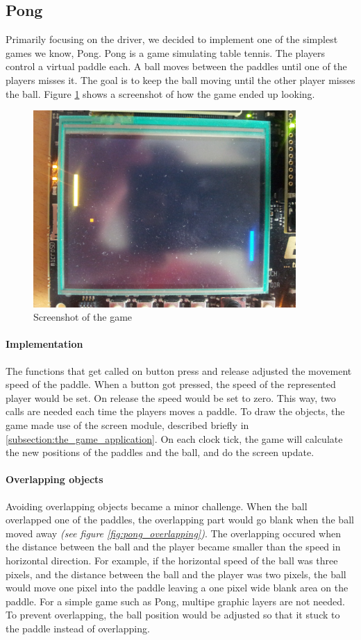 \subsection{Pong}
\label{subsection:pong}
Primarily focusing on the driver, we decided to implement one of the simplest games we know, Pong. Pong is a game simulating table tennis. The players control a virtual paddle each. A ball moves between the paddles until one of the players misses it. The goal is to keep the ball moving until the other player misses the ball. Figure \ref{fig:pong_screenshot} shows a screenshot of how the game ended up looking.

\begin{figure}[h]
	\label{fig:pong_screenshot}
	\centering
	\includegraphics[width=10cm]{img/pong_screen.jpg}
	\caption{Screenshot of the game}
\end{figure}

\paragraph{Implementation} The functions that get called on button press and release adjusted the movement speed of the paddle. When a button got pressed, the speed of the represented player would be set. On release the speed would be set to zero. This way, two calls are needed each time the players moves a paddle. To draw the objects, the game made use of the screen module, described briefly in \ref{subsection:the_game_application}. On each clock tick, the game will calculate the new positions of the paddles and the ball, and do the screen update.

\paragraph{Overlapping objects} 
Avoiding overlapping objects became a minor challenge. When the ball overlapped one of the paddles, the overlapping part would go blank when the ball moved away \emph{(see figure \ref{fig:pong_overlapping})}.
The overlapping occured when the distance between the ball and the player became smaller than the speed in horizontal direction. For example, if the horizontal speed of the ball was three pixels, and the distance between the ball and the player was two pixels, the ball would move one pixel into the paddle leaving a one pixel wide blank area on the paddle. For a simple game such as Pong, multipe graphic layers are not needed. To prevent overlapping, the ball position would be adjusted so that it stuck to the paddle instead of overlapping. 

